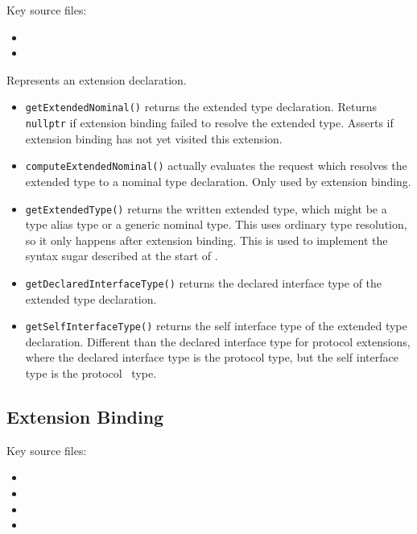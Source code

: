 \documentclass[../generics]{subfiles}
\begin{document}
Key source files:
\begin{itemize}
\item {}
\item {}
\end{itemize}

Represents an extension declaration.
\begin{itemize}
\item \texttt{getExtendedNominal()} returns the extended type declaration. Returns \verb|nullptr| if extension binding failed to resolve the extended type. Asserts if extension binding has not yet visited this extension.
\item \texttt{computeExtendedNominal()} actually evaluates the request which resolves the extended type to a nominal type declaration. Only used by extension binding.
\item \texttt{getExtendedType()} returns the written extended type, which might be a type alias type or a generic nominal type. This uses ordinary type resolution, so it only happens after extension binding. This is used to implement the syntax sugar described at the start of .
\item \texttt{getDeclaredInterfaceType()} returns the declared interface type of the extended type declaration.
\item \texttt{getSelfInterfaceType()} returns the self interface type of the extended type declaration. Different than the declared interface type for protocol extensions, where the declared interface type is the protocol type, but the self interface type is the protocol \tSelf\ type.
\end{itemize}

\subsection*{Extension Binding}

Key source files:
\begin{itemize}
\item {}
\item {}
\item {}
\item {}
\end{itemize}
\end{document}
